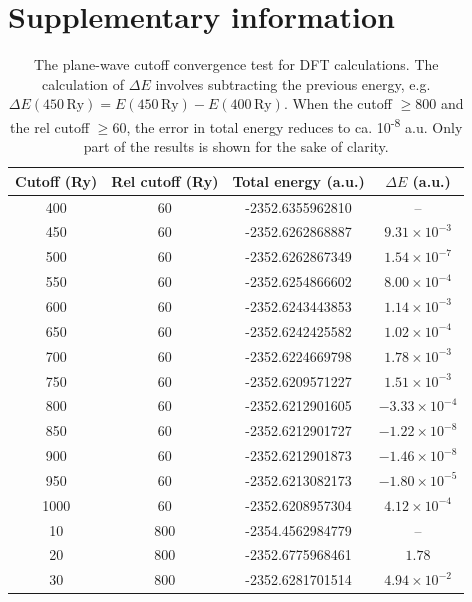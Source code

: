 \renewcommand{\thealgorithm}{A.\arabic{algorithm}}
\chapter{Supplementary information}

\begin{table}[htbp]
    \centering
    \caption{The plane-wave cutoff convergence test for DFT calculations. The calculation of $\Delta E$ involves subtracting the previous energy, e.g. $\Delta E(450\,\mathrm{Ry}) = E(450\,\mathrm{Ry}) - E(400\,\mathrm{Ry})$. When the cutoff $\ge 800$ and the rel cutoff $\ge 60$, the error in total energy reduces to ca. 10\textsuperscript{-8} a.u. Only part of the results is shown for the sake of clarity.}
    \label{tab:cutoff-convergence-test}
    \begin{tabular}{cccc}
    \toprule
    \textbf{Cutoff (Ry)} & \textbf{Rel cutoff (Ry)} & \textbf{Total energy (a.u.)} & \textbf{\boldmath$\Delta E$ (a.u.)} \\
    \midrule
    400 & 60 & -2352.6355962810 & -- \\
    450 & 60 &  -2352.6262868887 & $9.31 \times 10^{-3}$ \\
    500 & 60 &  -2352.6262867349 & $1.54 \times 10^{-7}$ \\
    550 & 60 &  -2352.6254866602 & $8.00 \times 10^{-4}$ \\
    600 & 60 &  -2352.6243443853 & $1.14 \times 10^{-3}$ \\
    650 & 60 &  -2352.6242425582 & $1.02 \times 10^{-4}$ \\
    700 & 60 &  -2352.6224669798 & $1.78 \times 10^{-3}$ \\
    750 & 60 &  -2352.6209571227 & $1.51 \times 10^{-3}$ \\
    800 & 60 &  -2352.6212901605 & $-3.33 \times 10^{-4}$ \\
    850 & 60 &  -2352.6212901727 & $-1.22 \times 10^{-8}$ \\
    900 & 60 &  -2352.6212901873 & $-1.46 \times 10^{-8}$ \\
    950 & 60 &  -2352.6213082173 & $-1.80 \times 10^{-5}$ \\
    1000 & 60 &  -2352.6208957304 & $4.12 \times 10^{-4}$ \\
    \midrule
    10 & 800 & -2354.4562984779 & -- \\
    20 & 800 &  -2352.6775968461 & $1.78$ \\
    30 & 800 &  -2352.6281701514 & $4.94 \times 10^{-2}$ \\

\end{tabular}
\end{table}

